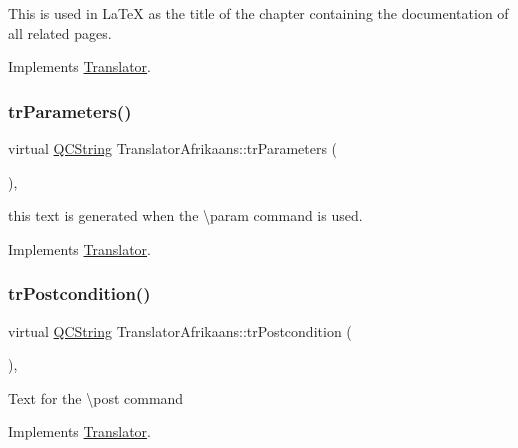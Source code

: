This is used in La\+TeX as the title of the chapter containing the documentation of all related pages. 

Implements \mbox{\hyperlink{class_translator}{Translator}}.

\mbox{\label{class_translator_afrikaans_a45727cc3f5040649991aba3ee5ca14d9}} 
\subsubsection{\texorpdfstring{trParameters()}{trParameters()}}
{\footnotesize\ttfamily virtual \mbox{\hyperlink{class_q_c_string}{Q\+C\+String}} Translator\+Afrikaans\+::tr\+Parameters (\begin{DoxyParamCaption}{ }\end{DoxyParamCaption})\hspace{0.3cm}{\ttfamily [inline]}, {\ttfamily [virtual]}}

this text is generated when the \textbackslash{}param command is used. 

Implements \mbox{\hyperlink{class_translator}{Translator}}.

\mbox{\label{class_translator_afrikaans_ac1dfd72f2ba1422f34c8eafdf067a6c0}} 
\subsubsection{\texorpdfstring{trPostcondition()}{trPostcondition()}}
{\footnotesize\ttfamily virtual \mbox{\hyperlink{class_q_c_string}{Q\+C\+String}} Translator\+Afrikaans\+::tr\+Postcondition (\begin{DoxyParamCaption}{ }\end{DoxyParamCaption})\hspace{0.3cm}{\ttfamily [inline]}, {\ttfamily [virtual]}}

Text for the \textbackslash{}post command 

Implements \mbox{\hyperlink{class_translator}{Translator}}.

\mbox{\label{class_translator_afrikaans_af875717db3603f0c75d9ade1fccaff62}} 
